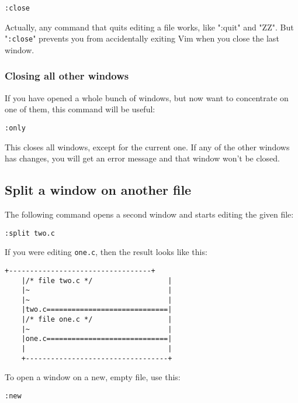  \begin{Verbatim}[samepage=true]
 :close
 \end{Verbatim}

Actually, any command that quits editing a file works, like ":quit" and "ZZ".
But "\verb!:close!" prevents you from accidentally exiting Vim when you close the last window.

\subsubsection{Closing all other windows}

If you have opened a whole bunch of windows, but now want to concentrate on one of them, this command will be useful:

 \begin{Verbatim}[samepage=true]
 :only
 \end{Verbatim}

This closes all windows, except for the current one.
If any of the other windows has changes, you will get an error message and that window won't be closed.

\subsection{Split a window on another file}
The following command opens a second window and starts editing the given file:

 \begin{Verbatim}[samepage=true]
 :split two.c
 \end{Verbatim}

If you were editing \verb!one.c!, then the result looks like this:

\begin{Verbatim}[samepage=true]
    +----------------------------------+
    |/* file two.c */                  |
    |~                                 |
    |~                                 |
    |two.c=============================|
    |/* file one.c */                  |
    |~                                 |
    |one.c=============================|
    |                                  |
    +----------------------------------+
\end{Verbatim}

To open a window on a new, empty file, use this:

 \begin{Verbatim}[samepage=true]
 :new
 \end{Verbatim}

